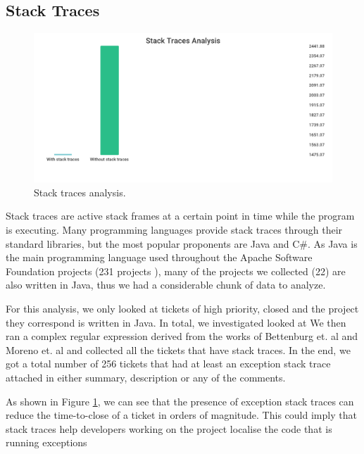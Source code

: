 \documentclass{mpaper}
\begin{document}
\subsection{Stack Traces}

\begin{figure}[ht]
  \begin{center}
    \includegraphics[scale=0.23]{images/stack_traces.png}
  \end{center}
  \caption{\label{stack_traces}Stack traces analysis.}
\end{figure}

Stack traces are active stack frames at a certain point in time while the program is executing. 
Many programming languages provide stack traces through their standard libraries, but the most 
popular proponents are Java and C\#. As Java is the main programming language used throughout 
the Apache Software Foundation projects (231 projects \cite{apache_projects}), many of the projects 
we collected (22) are also written in Java, thus we had a considerable chunk of data to analyze.

For this analysis, we only looked at tickets of high priority, closed and the project they correspond 
is written in Java. In total, we investigated looked at We then ran a complex regular expression derived from the works of Bettenburg et. al 
\cite{bettenburg2012using} and Moreno et. al \cite{moreno2014use} and collected all the tickets that have 
stack traces. In the end, we got a total number of 256 tickets that had at least an exception stack trace 
attached in either summary, description or any of the comments.

As shown in Figure \ref{stack_traces}, we can see that the presence of exception stack traces can 
reduce the time-to-close of a ticket in orders of magnitude. This could imply that stack traces help 
developers working on the project localise the code that is running exceptions 
\end{document}
